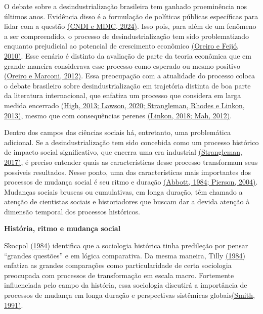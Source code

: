 O debate sobre a desindustrialização brasileira tem ganhado proeminência
nos últimos anos. Evidência disso é a formulação de políticas públicas
específicas para lidar com a questão
\href{https://www.zotero.org/google-docs/?wo4Op5}{(CNDI e MDIC, 2024)}.
Isso pois, para além de um fenômeno a ser compreendido, o processo de
desindustrialização tem sido problematizado enquanto prejudicial ao
potencial de crescimento econômico
\href{https://www.zotero.org/google-docs/?jIz1rX}{(Oreiro e Feijó,
2010)}. Esse cenário é distinto da avaliação de parte da teoria
econômica que em grande maneira considerava esse processo como esperado
ou mesmo positivo
\href{https://www.zotero.org/google-docs/?z9I4ma}{(Oreiro e Marconi,
2012)}. Essa preocupação com a atualidade do processo coloca o debate
brasileiro sobre desindustrialização em trajetória distinta de boa parte
da literatura internacional, que enfatiza um processo que considera em
larga medida encerrado
\href{https://www.zotero.org/google-docs/?ta9ftR}{(High, 2013; Lawson,
2020; Strangleman, Rhodes e Linkon, 2013)}, mesmo que com consequências
perenes \href{https://www.zotero.org/google-docs/?MUfXCU}{(Linkon, 2018;
Mah, 2012)}.

Dentro dos campos das ciências sociais há, entretanto, uma problemática
adicional. Se a desindustrialização tem sido concebida como um processo
histórico de impacto social significativo, que encerra uma era
industrial
\href{https://www.zotero.org/google-docs/?ky4Ed4}{(Strangleman, 2017)},
é preciso entender quais as características desse processo transformam
seus possíveis resultados. Nesse ponto, uma das características mais
importantes dos processos de mudança social é seu ritmo e duração
\href{https://www.zotero.org/google-docs/?G2kQTr}{(Abbott, 1984;
Pierson, 2004)}. Mudanças sociais bruscas ou cumulativas, em longa
duração, têm chamado a atenção de cientistas sociais e historiadores que
buscam dar a devida atenção à dimensão temporal dos processos
históricos.

\textbf{História, ritmo e mudança social}

Skocpol \href{https://www.zotero.org/google-docs/?N5g7Uw}{(1984)}
identifica que a sociologia histórica tinha predileção por pensar
``grandes questões'' e em lógica comparativa. Da mesma maneira, Tilly
\href{https://www.zotero.org/google-docs/?H0ADAb}{(1984)} enfatiza as
grandes comparações como particularidade de certa sociologia preocupada
com processos de transformação em escala macro. Fortemente influenciada
pelo campo da história, essa sociologia discutirá a importância de
processos de mudança em longa duração e perspectivas sistêmicas
globais\href{https://www.zotero.org/google-docs/?4OGNLt}{(Smith, 1991)}.


